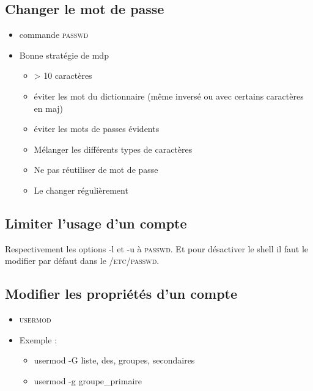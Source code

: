 \documentclass[a4paper]{article}
\begin{document}
    \subsection{Changer le mot de passe}
    \begin{itemize}
      \item commande \textsc{passwd}
      \item Bonne stratégie de mdp
      \begin{itemize}[label=, font=\scriptsize]
        \item > 10 caractères
        \item éviter les mot du dictionnaire (même inversé ou avec certains caractères en maj)
        \item éviter les mots de passes évidents
        \item Mélanger les différents types de caractères
        \item Ne pas réutiliser de mot de passe
        \item Le changer régulièrement
      \end{itemize}
    \end{itemize}
    \subsection{Limiter l'usage d'un compte}
    Respectivement les options -l et -u à \textsc{passwd}. Et pour désactiver le shell il faut le modifier par défaut dans le \textsc{/etc/passwd}.
    \subsection{Modifier les propriétés d'un compte}
    \begin{itemize}
      \item \textsc{usermod}
      \item Exemple :
      \begin{itemize}[label=, font=\scriptsize]
        \item usermod -G liste, des, groupes, secondaires
        \item usermod -g groupe\_primaire
      \end{itemize}
    \end{itemize}
\end{document}
